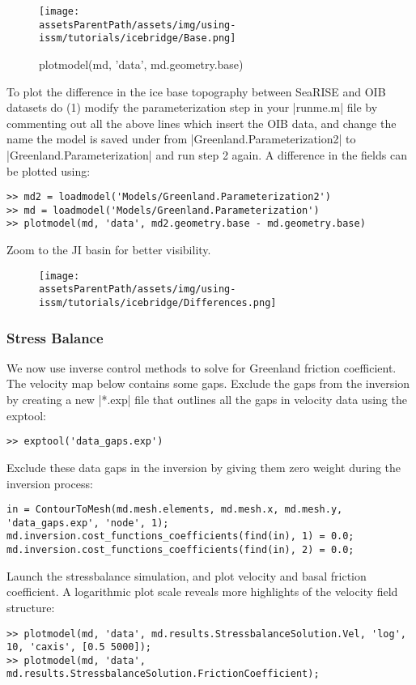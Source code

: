 \begin{figure}[H]
	\begin{center}
	\texttt{[image: \\assetsParentPath/assets/img/using-issm/tutorials/icebridge/Base.png]}
	\caption{plotmodel(md, 'data', md.geometry.base)}
	\end{center}
\end{figure}
To plot the difference in the ice base topography between SeaRISE and OIB datasets do (1) modify the parameterization step in your \lstinlinebg|runme.m| file by commenting out all the above lines which insert the OIB data, and change the name the model is saved under from \lstinlinebg|Greenland.Parameterization2| to \lstinlinebg|Greenland.Parameterization| and run step 2 again. A difference in the fields can be plotted using:
\begin{lstlisting}
>> md2 = loadmodel('Models/Greenland.Parameterization2')
>> md = loadmodel('Models/Greenland.Parameterization')
>> plotmodel(md, 'data', md2.geometry.base - md.geometry.base)
\end{lstlisting}
Zoom to the JI basin for better visibility.
\begin{figure}[H]
	\begin{center}
		\texttt{[image: \\assetsParentPath/assets/img/using-issm/tutorials/icebridge/Differences.png]}
	\end{center}
\end{figure}
\subsubsection{Stress Balance} %
We now use inverse control methods to solve for Greenland friction coefficient. The velocity map below contains some gaps. Exclude the gaps from the inversion by creating a new \lstinlinebg|*.exp| file that outlines all the gaps in velocity data using the exptool:
\begin{lstlisting}
>> exptool('data_gaps.exp')
\end{lstlisting}

Exclude these data gaps in the inversion by giving them zero weight during the inversion process:
\begin{lstlisting}
in = ContourToMesh(md.mesh.elements, md.mesh.x, md.mesh.y, 'data_gaps.exp', 'node', 1);
md.inversion.cost_functions_coefficients(find(in), 1) = 0.0;
md.inversion.cost_functions_coefficients(find(in), 2) = 0.0;
\end{lstlisting}

Launch the stressbalance simulation, and plot velocity and basal friction coefficient. A logarithmic
plot scale reveals more highlights of the velocity field structure:
\begin{lstlisting}
>> plotmodel(md, 'data', md.results.StressbalanceSolution.Vel, 'log', 10, 'caxis', [0.5 5000]);
>> plotmodel(md, 'data', md.results.StressbalanceSolution.FrictionCoefficient);
\end{lstlisting}

